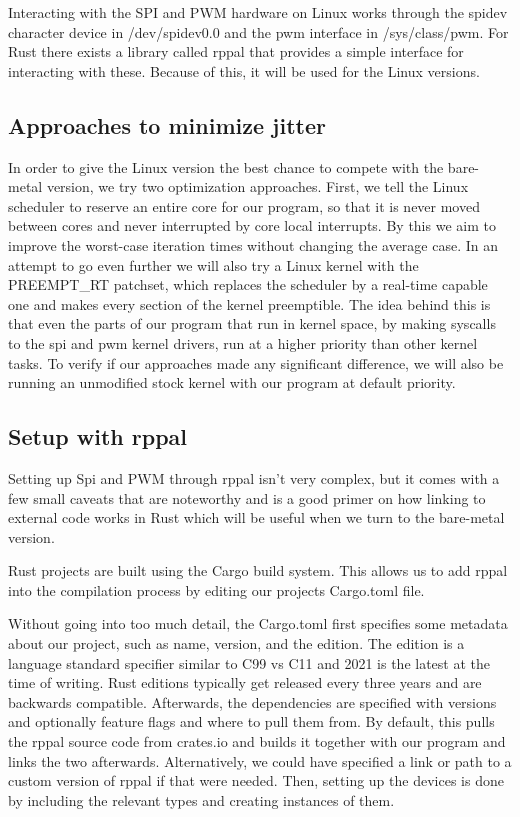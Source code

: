 Interacting with the SPI and PWM hardware on Linux works through the spidev character device in /dev/spidev0.0 and the pwm interface in /sys/class/pwm.
For Rust there exists a library called rppal that provides a simple interface for interacting with these.
Because of this, it will be used for the Linux versions.

\subsection{Approaches to minimize jitter}
\label{sec:concept_and_implementation:linux:approaches}

In order to give the Linux version the best chance to compete with the bare-metal version, we try two optimization approaches.
First, we tell the Linux scheduler to reserve an entire core for our program, so that it is never moved between cores and never interrupted by core local interrupts.
By this we aim to improve the worst-case iteration times without changing the average case.
In an attempt to go even further we will also try a Linux kernel with the PREEMPT\_RT patchset,
which replaces the scheduler by a real-time capable one and makes every section of the kernel preemptible.
The idea behind this is that even the parts of our program that run in kernel space,
by making syscalls to the spi and pwm kernel drivers, run at a higher priority than other kernel tasks.
To verify if our approaches made any significant difference, we will also be running an unmodified stock kernel with our program at default priority.

\subsection{Setup with rppal}
\label{sec:concept_and_implementation:linux:rppal}

Setting up Spi and PWM through rppal isn't very complex,
but it comes with a few small caveats that are noteworthy
and is a good primer on how linking to external code works in Rust which will be useful when we turn to the bare-metal version.

Rust projects are built using the Cargo build system. This allows us to add rppal into the compilation process by editing our projects Cargo.toml file.



Without going into too much detail, the Cargo.toml first specifies some metadata about our project, such as name, version, and the edition.
The edition is a language standard specifier similar to C99 vs C11 and 2021 is the latest at the time of writing.
Rust editions typically get released every three years and are backwards compatible.
Afterwards, the dependencies are specified with versions and optionally feature flags and where to pull them from.
By default, this pulls the rppal source code from crates.io and builds it together with our program and links the two afterwards.
Alternatively, we could have specified a link or path to a custom version of rppal if that were needed.
Then, setting up the devices is done by including the relevant types and creating instances of them.

